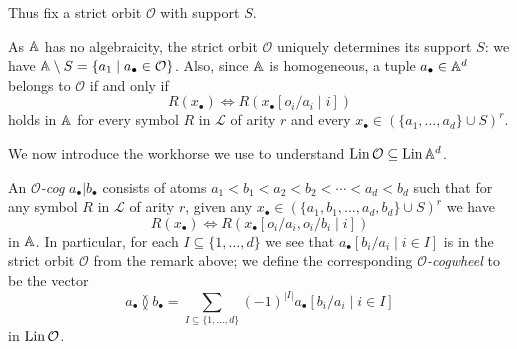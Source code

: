 Thus fix a strict orbit $\mathcal{O}$ with support $S$.

\begin{remark}
    As $\mathbb{A}$ has no algebraicity, the strict orbit $\mathcal{O}$ uniquely determines its support $S$: 
    we have $\mathbb{A} \setminus S = \{a_1 \mid a_\bullet \in \mathcal{O}\}$.
    Also, since $\mathbb{A}$ is homogeneous, a tuple $a_\bullet \in \mathbb{A}^d$ belongs to $\mathcal{O}$ if and only if
    \[
        R(x_\bullet) \iff R(x_\bullet[o_i / a_i \mid i])
    \]
    holds in $\mathbb{A}$ for every symbol $R$ in $\mathcal{L}$ of arity $r$ 
    and every $x_\bullet \in (\{a_1, \ldots, a_d\} \cup S)^r$.
\end{remark}

We now introduce the workhorse we use to understand $\operatorname{Lin} \mathcal{O} \subseteq \operatorname{Lin} \mathbb{A}^d$.
\begin{definition}\label{def:cogs}
    An \emph{$\mathcal{O}$-cog} $a_\bullet | b_\bullet$ consists of atoms $a_1 < b_1 < a_2 < b_2 < \cdots < a_d < b_d$ such that
    for any symbol $R$ in $\mathcal{L}$ of arity $r$,
    given any $x_\bullet \in (\{a_1, b_1, \ldots, a_d, b_d \} \cup S)^r$ we have
    \[
        R(x_\bullet) \iff R(x_\bullet[o_i / a_i, o_i / b_i \mid i ])
    \]
    in $\mathbb{A}$.
    In particular, for each $I \subseteq \{1, \ldots, d\}$ we see that $a_\bullet [b_i / a_i \mid i \in I]$ is in the strict orbit $\mathcal{O}$ from the remark above;
    we define the corresponding \emph{$\mathcal{O}$-cogwheel} to be the vector
    \[
        a_\bullet {\between} b_\bullet =
        \sum_{I \subseteq \{1, \ldots, d\}} (-1)^{|I|} a_\bullet[b_i / a_i \mid i \in I]
    \]
    in $\operatorname{Lin} \mathcal{O}$.
\end{definition}

